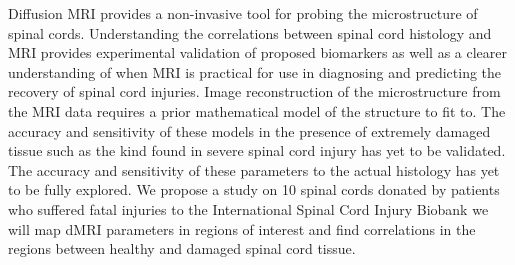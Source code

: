 Diffusion MRI provides a non-invasive tool for probing the microstructure of spinal cords. Understanding the correlations between spinal cord histology and MRI provides experimental validation of proposed biomarkers as well as a clearer understanding of when MRI is practical for use in diagnosing and predicting the recovery of spinal cord injuries. %
%
Image reconstruction of the microstructure from the MRI data requires a prior mathematical model of the structure to fit to. The accuracy and sensitivity of these models in the presence of extremely damaged tissue such as the kind found in severe spinal cord injury has yet to be validated. %
%
The accuracy and sensitivity of these parameters to the actual histology has yet to be fully explored.
\fi
%
We propose a study on 10 spinal cords donated by patients who suffered fatal injuries to the International Spinal Cord Injury Biobank we will map dMRI parameters in regions of interest and find correlations in the regions between healthy and damaged spinal cord tissue.